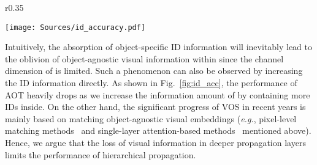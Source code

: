 \documentclass{article}
\def\eg{\emph{e.g.}}
\begin{document}
\begin{wrapfigure}[16]{r}{0.35\textwidth}
\begin{center}
\vspace{-6.5mm}
\texttt{[image: Sources/id\_accuracy.pdf]}
\caption{The performance of AOT~\cite{aot} will be degraded by increasing ID's maximum number. }\label{fig:id_acc}
\end{center}
\end{wrapfigure} 
Intuitively, the absorption of object-specific ID information will inevitably lead to the oblivion of object-agnostic visual information within  since the channel dimension of  is limited. Such a phenomenon can also be observed by increasing the ID information directly. As shown in Fig.~\ref{fig:id_acc}, the performance of AOT heavily drops as we increase the information amount of  by containing more IDs inside. On the other hand, the significant progress of VOS in recent years is mainly based on matching object-agnostic visual embeddings (\eg, pixel-level matching methods~\cite{cfbi,cfbip,rpcm} and single-layer attention-based methods~\cite{spacetime,KMN,cheng2021stcn} mentioned above). Hence, we argue that the loss of visual information in deeper propagation layers limits the performance of hierarchical propagation.
\end{document}

